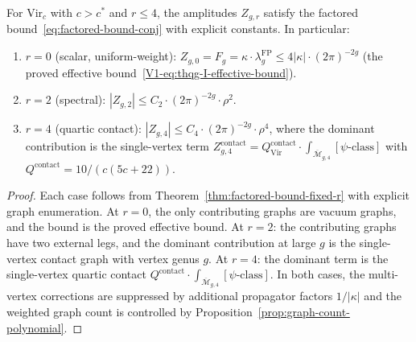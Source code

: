 \begin{corollary}
\label{cor:factored-bound-r4}
For $\mathrm{Vir}_c$ with $c > c^*$ and $r \leq 4$, the amplitudes
$Z_{g,r}$ satisfy the factored bound~\eqref{eq:factored-bound-conj}
with explicit constants. In particular:
\begin{enumerate}[label=\textup{(\roman*)}]
\item $r = 0$ \textup{(}scalar, uniform-weight\textup{)}: $Z_{g,0} = F_g =
 \kappa \cdot \lambda_g^{\mathrm{FP}} \leq 4|\kappa| \cdot
 (2\pi)^{-2g}$ \textup{(}the proved effective
 bound~\eqref{V1-eq:thqg-I-effective-bound}\textup{)}.
\item $r = 2$ \textup{(}spectral\textup{)}: $|Z_{g,2}| \leq
 C_2 \cdot (2\pi)^{-2g} \cdot \rho^2$.
\item $r = 4$ \textup{(}quartic contact\textup{)}: $|Z_{g,4}|
 \leq C_4 \cdot (2\pi)^{-2g} \cdot \rho^4$, where the dominant
 contribution is the single-vertex term
 $Z_{g,4}^{\mathrm{contact}} = Q^{\mathrm{contact}}_{\mathrm{Vir}}
 \cdot \int_{\overline{\mathcal{M}}_{g,4}} [\psi\text{-class}]$
 with $Q^{\mathrm{contact}} = 10/(c(5c+22))$.
\end{enumerate}
\end{corollary}

\begin{proof}
Each case follows from
Theorem~\ref{thm:factored-bound-fixed-r} with explicit
graph enumeration. At $r = 0$, the only contributing graphs
are vacuum graphs, and the bound is the proved effective
bound. At $r = 2$: the contributing graphs have two external
legs, and the dominant contribution at large $g$ is the
single-vertex contact graph with vertex genus $g$. At $r = 4$:
the dominant term is the single-vertex quartic contact
$Q^{\mathrm{contact}} \cdot
\int_{\overline{\mathcal{M}}_{g,4}} [\psi\text{-class}]$.
In both cases, the multi-vertex corrections are suppressed by
additional propagator factors $1/|\kappa|$ and the weighted
graph count is controlled by
Proposition~\ref{prop:graph-count-polynomial}.
\end{proof}

